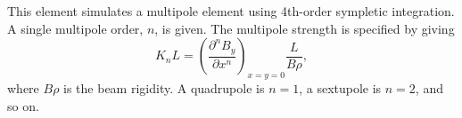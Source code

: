 \begin{raggedright}

This element simulates a multipole element using 4th-order sympletic
integration.  A single multipole order, $n$, is given.  The multipole
strength is specified by giving
\begin{equation}
K_n L = \left(\frac{\partial^n B_y}{\partial x^n}\right)_{x=y=0} \frac{L}{B\rho},
\end{equation}
where $B\rho$ is the beam rigidity.  A quadrupole is $n=1$, a sextupole is $n=2$,
and so on.


\end{raggedright}
